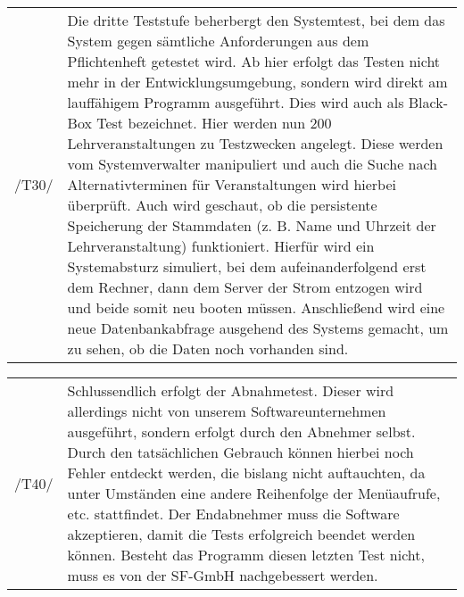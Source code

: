 \begin{tabular}{p{1.5cm}p{14.5cm}}
 /T30/	& Die dritte Teststufe beherbergt den Systemtest, bei dem das System gegen sämtliche Anforderungen aus dem Pflichtenheft getestet wird. Ab hier erfolgt das Testen nicht mehr in der Entwicklungsumgebung, sondern wird direkt am lauffähigem Programm ausgeführt. Dies wird auch als Black-Box Test bezeichnet.
Hier werden nun 200 Lehrveranstaltungen zu Testzwecken angelegt. Diese werden vom Systemverwalter manipuliert und auch die Suche nach Alternativterminen für Veranstaltungen wird hierbei überprüft. Auch wird geschaut, ob die persistente Speicherung der Stammdaten
(z. B. Name und Uhrzeit der Lehrveranstaltung) funktioniert. Hierfür wird ein Systemabsturz simuliert, bei dem aufeinanderfolgend erst dem Rechner, dann dem Server der Strom entzogen wird und beide somit neu booten müssen. Anschließend wird eine neue Datenbankabfrage ausgehend des Systems gemacht, um zu sehen, ob die Daten noch vorhanden sind. \\[0.25cm]	 
\end{tabular}

\begin{tabular}{p{1.5cm}p{14.5cm}}
 /T40/	& Schlussendlich erfolgt der Abnahmetest. Dieser wird allerdings nicht von unserem Softwareunternehmen ausgeführt, sondern erfolgt durch den Abnehmer selbst. Durch den tatsächlichen Gebrauch können hierbei noch Fehler entdeckt werden, die bislang nicht auftauchten, da unter Umständen eine andere Reihenfolge der Menüaufrufe, etc. stattfindet. Der Endabnehmer muss die Software akzeptieren, damit die Tests erfolgreich beendet werden können. Besteht das Programm diesen letzten Test nicht, muss es von der SF-GmbH  nachgebessert werden. \\[0.25cm]	 
\end{tabular}